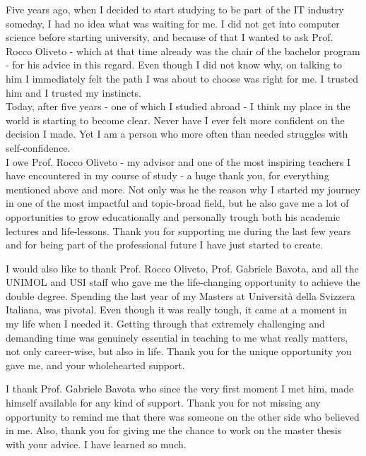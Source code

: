 \begin{acknowledgements}

\addchaptertocentry{\acknowledgementname}
Five years ago, when I decided to start studying to be part of the IT industry someday, 
I had no idea what was waiting for me. 
I did not get into computer science before starting university, and because of that 
I wanted to ask Prof. Rocco Oliveto - which at that time already was the chair of the bachelor program - for his advice 
in this regard. Even though I did not know why, on talking to him I immediately felt the path I was about to choose was right for me. 
I trusted him and I trusted my instincts. \\
Today, after five years - one of which I studied abroad - I think my place in the world is starting to become clear.
Never have I ever felt more confident on the decision I made. Yet I am a person who more often than needed struggles with self-confidence.\\
\newline
I owe Prof. Rocco Oliveto - my advisor and one of the most inspiring teachers I have encountered
in my course of study - a huge thank you, for everything mentioned above and more. Not only was he the reason why I started my journey in one of the most impactful and topic-broad field, 
but he also gave me a lot of opportunities to grow educationally and personally trough both his academic lectures and life-lessons.
Thank you for supporting me during the last few years and for being part of the professional future I have just started to create.

I would also like to thank Prof. Rocco Oliveto, Prof. Gabriele Bavota, and all the UNIMOL and USI staff who gave me the life-changing opportunity to 
achieve the double degree. 
Spending the last year of my Masters at Università della Svizzera Italiana, was pivotal. Even though it was
really tough, it came at a moment in my life when I needed it. 
Getting through that extremely challenging and demanding 
time was genuinely essential in teaching to me what really matters, not only career-wise, but also in life. Thank you 
for the unique opportunity you gave me, and your wholehearted support.

I thank Prof. Gabriele Bavota who since the very first moment I met him, made himself available for any kind of support. 
Thank you for not missing any opportunity to remind me that there was someone on the other side who believed in me. Also, thank you 
for giving me the chance to work on the master thesis with your advice. I have learned so much.


\end{acknowledgements}
